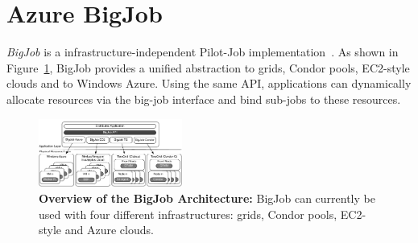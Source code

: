 \documentclass[conference,final]{IEEEtran}
\newcommand{\up}{\vspace*{-1em}}
\begin{document}
\up
\section{Azure BigJob}
\label{sec:bigjob-saga}
\up


\emph{BigJob} is a infrastructure-independent Pilot-Job implementation~\cite{10.1109/CCGRID.2010.91}.
As shown in Figure~\ref{fig:figures_distributed_pilot_job}, BigJob 
provides a unified abstraction to grids, Condor pools,
EC2-style clouds and to Windows Azure. Using the same API, applications 
can dynamically allocate resources via the big-job interface and 
bind sub-jobs to these resources. 

\begin{figure}[t]
    \centering
        \includegraphics[width=0.42\textwidth]{figures/distributed_pilot_job}
        \caption{\textbf{Overview of the BigJob Architecture:} BigJob can 
        currently be used with four different infrastructures: grids, Condor pools, 
        EC2-style and Azure clouds.\up}
    \label{fig:figures_distributed_pilot_job}

\end{figure}


\end{document}
